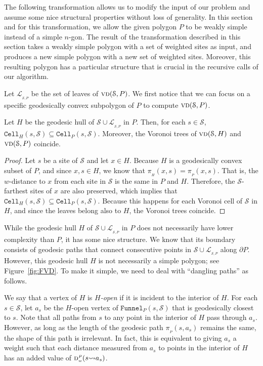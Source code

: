 \documentclass[a4paper,UKenglish]{socg-lipics-v2018}
\newcommand{\s}{\mathcal S}
\newcommand{\dd}[3][P]{\ensuremath{\textsc{d}_{\scriptscriptstyle w}^{\scriptscriptstyle #1}(#2 {\leadsto} #3)}}
\newcommand{\p}[3][P]{\ensuremath{\pi_{_{#1}}(#2, #3)}}
\newcommand{\funnel}[2][P]{\ensuremath{\mathtt{Funnel}_{\scriptscriptstyle #1}(#2)}}
\newcommand{\cell}[2][P]{\ensuremath{\mathtt{Cell}_{\scriptscriptstyle #1}(#2)}}
\newcommand{\vd}[2][P]{\textsc{vd}(#2, #1)}
\newcommand{\LL}[1][\s, P]{\ensuremath{\mathcal L_{_{#1}}}}
\begin{document}
The following transformation allows us to modify the input of our problem and assume some nice structural properties without loss of generality.
In this section and for this transformation, we allow the given polygon $P$ to be weakly simple instead of a simple $n$-gon. 
The result of the transformation described in this section takes a weakly simple polygon with a set of weighted sites as input, and produces a new simple polygon with a new set of weighted sites. Moreover, this resulting polygon has a particular structure that is crucial in the recursive calls of our algorithm.

Let $\LL$ be the set of leaves of $\vd{\s}$.
We first notice that we can focus on a specific geodesically convex subpolygon of $P$ to compute $\vd{\s}$.

\begin{lemma}\label{lemma:Voronoi coincides for geodesically convex subsets}
Let $H$ be the geodesic hull of $\s\cup \LL$ in $P$.
Then, for each $s\in \s$, $\cell[H]{s, \s} \subseteq \cell{s, \s}$. Moreover, the Voronoi trees of $\vd[H]{\s}$ and $\vd{\s}$ coincide. 
\end{lemma}
\begin{proof}
Let $s$ be a site of $\s$ and let $x\in H$. 
Because $H$ is a geodesically convex subset of $P$, and since $x,s\in H$, we know that $\p[H]{x}{s} = \p{x}{s}$. 
That is, the $w$-distance to $x$ from each site in $\s$ is the same in $P$ and $H$. 
Therefore, the $\s$-farthest sites of $x$ are also preserved, which implies that $\cell[H]{s, \s} \subseteq \cell{s, \s}$. 
Because this happens for each Voronoi cell of $\s$ in $H$, and since the leaves belong also to $H$, the Voronoi trees coincide.
\end{proof}

While the geodesic hull $H$ of $\s\cup \LL$ in $P$ does not necessarily have lower complexity than $P$, it has some nice structure. 
We know that its boundary consists of geodesic paths that connect consecutive points in $\s\cup \LL$ along $\partial P$.
However, this geodesic hull $H$ is not necessarily a simple polygon; see Figure~\ref{fig:FVD}. 
To make it simple, we need to deal with ``dangling paths'' as follows.

We say that a vertex of $H$ is \emph{$H$-open} if it is incident to the interior of $H$.
For each $s\in \s$, let $a_s$ be the $H$-open vertex of $\funnel{s, \s}$ that is geodesically closest to $s$. 
Note that all paths from $s$ to any point in the interior of $H$ pass through $a_s$.
However, as long as the length of the geodesic path $\p{s}{a_s}$ remains the same, the shape of this path is irrelevant. 
In fact, this is equivalent to giving $a_s$ a weight such that each distance measured from $a_s$ to points in the interior of $H$ has 
an added value of $\dd{s}{a_s}$. 
\end{document}
